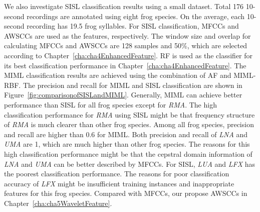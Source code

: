 We also investigate SISL classification results using a small dataset. Total 176 10-second recordings are annotated using eight frog species. On the average, each 10-second recording has 19.5 frog syllables. For SISL classification, MFCCs and AWSCCs are used as the features, respectively. The window size and overlap for calculating MFCCs and AWSCCs are 128 samples and 50\%, which are selected according to Chapter~\ref{cha:cha4EnhancedFeature}. RF is used as the classifier for its best classification performance in Chapter~\ref{cha:cha4EnhancedFeature}. 
The MIML classification results are achieved using the combination of AF and MIML-RBF. The precision and recall for MIML and SISL classification are shown in Figure~\ref{fig:comparisonofSISLandMIML}. Generally, MIML can achieve better performance than SISL for all frog species except for \textit{RMA}. The high classification performance for \textit{RMA} using SISL might be that frequency structure of \textit{RMA} is much clearer than other frog species. Among all frog species, precision and recall are higher than 0.6 for MIML. Both precision and recall of \textit{LNA} and \textit{UMA} are 1, which are much higher than other frog species. The reasons for this high classification performance might be that the cepstral domain information of \textit{LNA} and \textit{UMA} can be better described by MFCCs. For SISL, \textit{LUA} and \textit{LFX} has the poorest classification performance. The reasons for poor classification accuracy of \textit{LFX} might be insufficient training instances and inappropriate features for this frog species. Compared with MFCCs, our propose AWSCCs in Chapter~\ref{cha:cha5WaveletFeature}.


